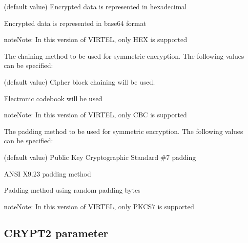 \documentclass[letterpaper,10pt,english]{sphinxmanual}
\begin{document}
\sphinxAtStartPar
{} \sphinxhyphen{} (default value) Encrypted data is represented in hexadecimal

\sphinxAtStartPar
{} \sphinxhyphen{} Encrypted data is represented in base64 format

\begin{sphinxadmonition}{note}{Note:}
\sphinxAtStartPar
In this version of VIRTEL, only HEX is supported
\end{sphinxadmonition}

\sphinxAtStartPar
{} \sphinxhyphen{} The chaining method to be used for symmetric encryption. The following values can be specified:

\sphinxAtStartPar
{} \sphinxhyphen{} (default value) Cipher block chaining will be used.

\sphinxAtStartPar
{} \sphinxhyphen{} Electronic codebook will be used

\begin{sphinxadmonition}{note}{Note:}
\sphinxAtStartPar
In this version of VIRTEL, only CBC is supported
\end{sphinxadmonition}

\sphinxAtStartPar
{} \sphinxhyphen{} The padding method to be used for symmetric encryption. The following values can be specified:

\sphinxAtStartPar
{} \sphinxhyphen{} (default value) Public Key Cryptographic Standard \#7 padding

\sphinxAtStartPar
{} \sphinxhyphen{} ANSI X9.23 padding method

\sphinxAtStartPar
{} \sphinxhyphen{} Padding method using random padding bytes

\begin{sphinxadmonition}{note}{Note:}
\sphinxAtStartPar
In this version of VIRTEL, only PKCS7 is supported
\end{sphinxadmonition}

\ignorespaces 

\subsection{CRYPT2 parameter}
\label{\detokenize{Installation_Guide:crypt2-parameter}}\label{\detokenize{Installation_Guide:index-50}}
\begin{sphinxVerbatim}[commandchars=\\\{\}]
\PYG{p}{[}\PYG{p}{]}\PYG{p}{[}\PYG{p}{]}\PYG{p}{[}\PYG{p}{]}\PYG{p}{[}\PYG{p}{]}\PYG{p}{[}\PYG{p}{]}\PYG{p}{[}\PYG{p}{]}
\end{sphinxVerbatim}
\end{document}
